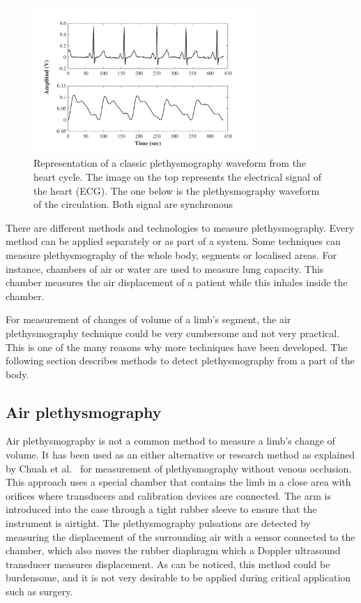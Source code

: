 \begin{figure}[!htpb]
	\centering
	\includegraphics[width=0.75\textwidth,keepaspectratio]{figure1}    
	\caption[Classic plethysmography waveform]{Representation of a classic plethysmography waveform from the heart cycle. The image on the top represents the electrical signal of the heart (ECG). The one below is the plethysmography waveform of the circulation. Both signal are synchronous}
	\label{fig:plethysmography}
\end{figure}

There are different methods and technologies to measure plethysmography. Every method can be applied separately or as part of a system. Some techniques can measure plethysmography of the whole body, segments or localised areas. For instance, chambers of air or water are used to measure lung capacity. This chamber measures the air displacement of a patient while this inhales inside the chamber. 

For measurement of changes of volume of a limb's segment, the air plethysmography technique could be very cumbersome and not very practical. This is one of the many reasons why more techniques have been developed. The following section describes methods to detect plethysmography from a part of the body.

\subsection{Air plethysmography}
\label{section literature 3.1}
Air plethysmography is not a common method to measure a limb’s change of volume. It has been used as an either alternative or research method as explained by Chuah et al.~\cite{chuah2004plethysmography} for measurement of plethysmography without venous occlusion. This approach uses a special chamber that contains the limb in a close area with orifices where transducers and calibration devices are connected. The arm is introduced into the case through a tight rubber sleeve to ensure that the instrument is airtight.  The plethysmography pulsations are detected by measuring the displacement of the surrounding air with a sensor connected to the chamber, which also moves the rubber diaphragm which a Doppler ultrasound transducer measures displacement. As can be noticed, this method could be burdensome, and it is not very desirable to be applied during critical application such as surgery.

